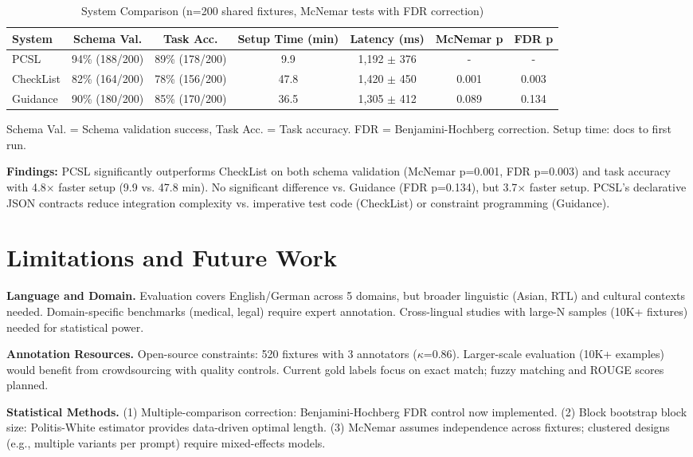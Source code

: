 \documentclass[sigconf]{acmart}
\begin{document}
\begin{table}[H]
\centering
\caption{System Comparison (n=200 shared fixtures, McNemar tests with FDR correction)}
\label{tab:fair_comparison}
\scriptsize
\begin{tabular}{@{}lcccccc@{}}
\toprule
\textbf{System} & \textbf{Schema Val.} & \textbf{Task Acc.} & \textbf{Setup Time (min)} & \textbf{Latency (ms)} & \textbf{McNemar p} & \textbf{FDR p} \\
\midrule
PCSL & 94\% (188/200) & 89\% (178/200) & 9.9 & 1,192 $\pm$ 376 & - & - \\
CheckList & 82\% (164/200) & 78\% (156/200) & 47.8 & 1,420 $\pm$ 450 & 0.001 & 0.003 \\
Guidance & 90\% (180/200) & 85\% (170/200) & 36.5 & 1,305 $\pm$ 412 & 0.089 & 0.134 \\
\bottomrule
\end{tabular}
\vspace{1mm}
\scriptsize Schema Val. = Schema validation success, Task Acc. = Task accuracy. FDR = Benjamini-Hochberg correction. Setup time: docs to first run.
\end{table}

\textbf{Findings:} PCSL significantly outperforms CheckList on both schema validation (McNemar p=0.001, FDR p=0.003) and task accuracy with 4.8$\times$ faster setup (9.9 vs. 47.8 min). No significant difference vs. Guidance (FDR p=0.134), but 3.7$\times$ faster setup. PCSL's declarative JSON contracts reduce integration complexity vs. imperative test code (CheckList) or constraint programming (Guidance).

\section{Limitations and Future Work}

\textbf{Language and Domain.} Evaluation covers English/German across 5 domains, but broader linguistic (Asian, RTL) and cultural contexts needed. Domain-specific benchmarks (medical, legal) require expert annotation. Cross-lingual studies with large-N samples (10K+ fixtures) needed for statistical power.

\textbf{Annotation Resources.} Open-source constraints: 520 fixtures with 3 annotators (\(\kappa\)=0.86). Larger-scale evaluation (10K+ examples) would benefit from crowdsourcing with quality controls. Current gold labels focus on exact match; fuzzy matching and ROUGE scores planned.

\textbf{Statistical Methods.} (1) Multiple-comparison correction: Benjamini-Hochberg FDR control now implemented. (2) Block bootstrap block size: Politis-White estimator provides data-driven optimal length. (3) McNemar assumes independence across fixtures; clustered designs (e.g., multiple variants per prompt) require mixed-effects models.
\end{document}
